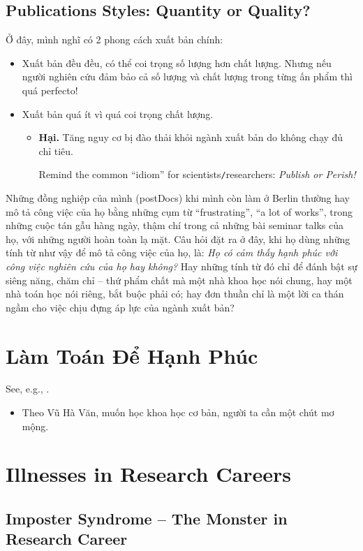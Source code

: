 \documentclass{article}
\numberwithin{equation}{section}
\begin{document}
\subsection{Publications Styles: Quantity or Quality?}
Ở đây, mình nghĩ có 2 phong cách xuất bản chính:
\begin{itemize}
	\item Xuất bản đều đều, có thể coi trọng số lượng hơn chất lượng. Nhưng nếu người nghiên cứu đảm bảo cả số lượng và chất lượng trong từng ấn phẩm thì quá perfecto!
	\item Xuất bản quá ít vì quá coi trọng chất lượng.
	\begin{itemize}
		\item \textbf{Hại.} Tăng nguy cơ bị đào thải khỏi ngành xuất bản do không chạy đủ chỉ tiêu.
		
		Remind the common ``idiom'' for scientists\texttt{/}researchers: \textit{Publish or Perish!}
	\end{itemize}
\end{itemize}
Những đồng nghiệp của mình (postDocs) khi mình còn làm ở Berlin thường hay mô tả công việc của họ bằng những cụm từ ``frustrating'', ``a lot of works'', trong những cuộc tán gẫu hàng ngày, thậm chí trong cả những bài seminar talks của họ, với những người hoàn toàn lạ mặt. Câu hỏi đặt ra ở đây, khi họ dùng những tính từ như vậy để mô tả công việc của họ, là: \textit{Họ có cảm thấy hạnh phúc với công việc nghiên cứu của họ hay không?} Hay những tính từ đó chỉ để đánh bật sự siêng năng, chăm chỉ -- thứ phẩm chất mà một nhà khoa học nói chung, hay một nhà toán học nói riêng, bắt buộc phải có; hay đơn thuần chỉ là một lời ca thán ngầm cho việc chịu đựng áp lực của ngành xuất bản?

\section{Làm Toán Để Hạnh Phúc}
See, e.g., \cite{TN/VHV}.
\begin{itemize}
	\item Theo Vũ Hà Văn, muốn học khoa học cơ bản, người ta cần một chút mơ mộng.
\end{itemize}

\section{Illnesses in Research Careers}

\subsection{Imposter Syndrome -- The Monster in Research Career}
\end{document}
